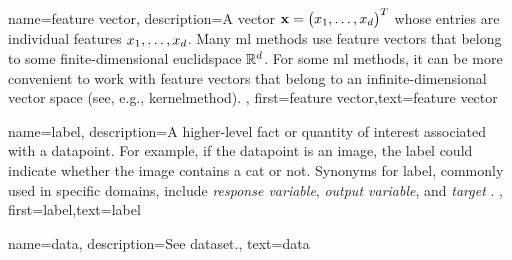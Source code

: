 {name={feature vector},
	description={A vector ${\bf x} = \big(x_{1},\ldots,x_{d}\big)^{T}$ 
	whose entries are individual \gls{feature}s $x_{1},\ldots,x_{d}$. Many \gls{ml} methods 
	use feature vectors that belong to some finite-dimensional \gls{euclidspace} $\mathbb{R}^{d}$. 
	For some \gls{ml} methods, it can be more convenient to work with feature 
	vectors that belong to an infinite-dimensional vector space (see, e.g., \gls{kernelmethod}). 
		}, first={feature vector},text={feature vector}  
}


{name={label},
	description={A higher-level fact or quantity of interest associated with a \gls{datapoint}. 
		For example, if the \gls{datapoint} is an image, the label could indicate whether the 
		image contains a cat or not. Synonyms for label, commonly used in specific domains, 
		include \emph{response variable}, \emph{output variable}, and \emph{target} \cite{Gujarati2021,Dodge2003,Everitt2022}.
 },
	first={label},text={label}  
}


{name={data},
	 description={See \gls{dataset}.},
	text={data}
}

